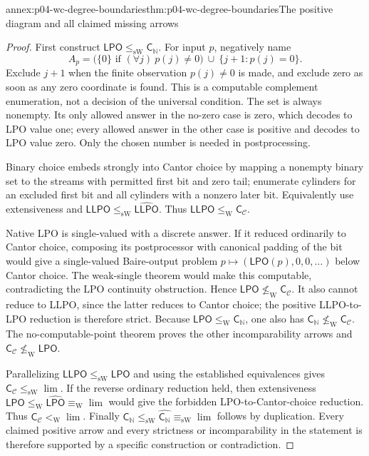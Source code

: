 \begin{annexitem}{annex:p04-wc-degree-boundaries}{thm:p04-wc-degree-boundaries}{The positive diagram and all claimed missing arrows}
\begin{proof}
First construct \(\mathsf{LPO}\leq_{\mathrm{sW}}\mathsf{C}_{\mathbb N}\).
For input \(p\), negatively name
\[
 A_p=\bigl(\{0\}\text{ if }(\forall j)\ p(j)\ne0\bigr)
       \ \cup\ \{j+1:p(j)=0\}.
\]
Exclude \(j+1\) when the finite observation \(p(j)\ne0\) is
made, and exclude zero as soon as any zero coordinate is found.
This is a computable complement enumeration, not a decision of the
universal condition. The set is always nonempty. Its only allowed
answer in the no-zero case is zero, which decodes to LPO value one;
every allowed answer in the other case is positive and decodes to
LPO value zero. Only the chosen number is needed in postprocessing.

Binary choice embeds strongly into Cantor choice by mapping a nonempty
binary set to the streams with permitted first bit and zero tail;
enumerate cylinders for an excluded first bit and all cylinders with
a nonzero later bit. Equivalently use extensiveness and
\(\mathsf{LLPO}\leq_{\mathrm{sW}}\widehat{\mathsf{LLPO}}\).
Thus \(\mathsf{LLPO}\leq_{\mathrm W} \mathsf{C}_{\mathcal C}\).

Native LPO is single-valued with a discrete answer. If it reduced
ordinarily to Cantor choice, composing its postprocessor with
canonical padding of the bit would give a single-valued Baire-output
problem \(p\mapsto(\mathsf{LPO}(p),0,0,\ldots)\) below Cantor choice.
The weak-single theorem would make this computable, contradicting
the LPO continuity obstruction. Hence
\(\mathsf{LPO}\not\leq_{\mathrm W} \mathsf{C}_{\mathcal C}\).
It also cannot reduce to LLPO, since the latter reduces to Cantor choice;
the positive LLPO-to-LPO reduction is therefore strict.
Because \(\mathsf{LPO}\leq_{\mathrm W} \mathsf{C}_{\mathbb N}\), one also has
\(\mathsf{C}_{\mathbb N}\not\leq_{\mathrm W} \mathsf{C}_{\mathcal C}\).
The no-computable-point theorem proves the other incomparability arrows
and \(\mathsf{C}_{\mathcal C}\not\leq_{\mathrm W}\mathsf{LPO}\).

Parallelizing \(\mathsf{LLPO}\leq_{\mathrm{sW}}\mathsf{LPO}\) and using
the established equivalences gives
\(\mathsf{C}_{\mathcal C}\leq_{\mathrm{sW}}\lim\).
If the reverse ordinary reduction held, then extensiveness
\(\mathsf{LPO}\leq_{\mathrm W}\widehat{\mathsf{LPO}}\equiv_{\mathrm W}\lim\)
would give the forbidden LPO-to-Cantor-choice reduction.
Thus \(\mathsf{C}_{\mathcal C}<_{\mathrm W}\lim\).
Finally \(\mathsf{C}_{\mathbb N}\leq_{\mathrm{sW}}\widehat{\mathsf{C}_{\mathbb N}}
\equiv_{\mathrm{sW}}\lim\) follows by duplication. Every claimed positive
arrow and every strictness or incomparability in the statement is
therefore supported by a specific construction or contradiction.
\end{proof}
\end{annexitem}
